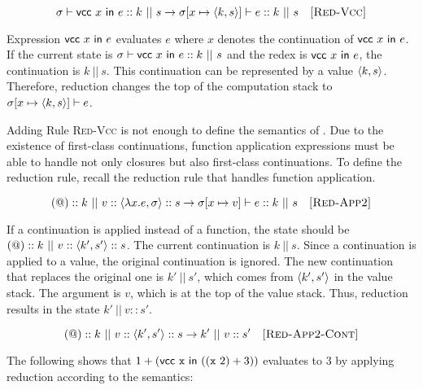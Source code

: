 \[
  \sigma\vdash\textsf{vcc}\ x\ \textsf{in}\ e::k\ ||\ s\rightarrow
  \sigma[x\mapsto\langle k,s\rangle]\vdash e::k\ ||\ s
  \quad\textsc{[Red-Vcc]}
\]

Expression $\textsf{vcc}\ x\ \textsf{in}\ e$ evaluates $e$ where $x$ denotes the
continuation of $\textsf{vcc}\ x\ \textsf{in}\ e$. If the current state is $\sigma\vdash\textsf{vcc}\ x\ \textsf{in}\ e::k\
||\ s$ and the redex is $\textsf{vcc}\ x\ \textsf{in}\ e$, the continuation is $k\ ||\ s$.
This continuation can be represented by a value $\langle k,s\rangle$. Therefore,
reduction changes the top of the
computation stack to $\sigma[x\mapsto\langle k,s\rangle]\vdash e$.

Adding Rule \textsc{Red-Vcc} is not enough to define the semantics of \Lang.
Due to the existence of first-class continuations, function application
expressions must be able to handle not only closures but also first-class
continuations. To define the reduction rule, recall the reduction rule that
handles function application.

\[
  \appk k\ ||\ \conss{v}\conss{\clov{x}{e}{\sigma}}s\rightarrow
  \evalk{\sigma\lbrack x\mapsto v\rbrack}{e}k\ ||\ s
  \quad\textsc{[Red-App2]}
\]

If a continuation is applied instead of a function,
the state should be $\appk k\ ||\ \conss{v}\conss{\contv{k'}{s'}}s$.
The current continuation is $k\ ||\ s$. Since a continuation is applied to a
value, the original continuation is ignored. The new continuation that replaces the original
one is $k'\ ||\ s'$, which comes from $\langle k',s'\rangle$ in the value stack.
The argument is $v$, which is at the top of the value stack.
Thus, reduction results in the state $k'\ ||\ v::s'$.

\[
  \appk k\ ||\ \conss{v}\conss{\contv{k'}{s'}}s\rightarrow k'\ ||\ v::s'
  \quad\textsc{[Red-App2-Cont]}
\]

The following shows that $1+(\textsf{vcc}\ \cx\ \textsf{in}\ ((\cx\ 2)+3))$
evaluates to $3$ by applying reduction according to the semantics:

